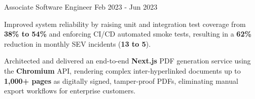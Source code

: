 \begin{cventries}
  \cventry
    {Associate Software Engineer} %
    {} %
    {} %
    {Feb 2023 - Jun 2023} %
    {
      \begin{cvitems} %
        \item {Improved system reliability by raising unit and integration test coverage from \textbf{38\% to 54\%} and enforcing CI/CD automated smoke tests, resulting in a \textbf{62\%} reduction in monthly SEV incidents (\textbf{13 to 5}).}
        \item {Architected and delivered an end-to-end \textbf{Next.js} PDF generation service using the \textbf{Chromium} API, rendering complex inter-hyperlinked documents up to \textbf{1,000+ pages} as digitally signed, tamper-proof PDFs, eliminating manual export workflows for enterprise customers.}
        \item {}
      \end{cvitems}
    }


\end{cventries}
